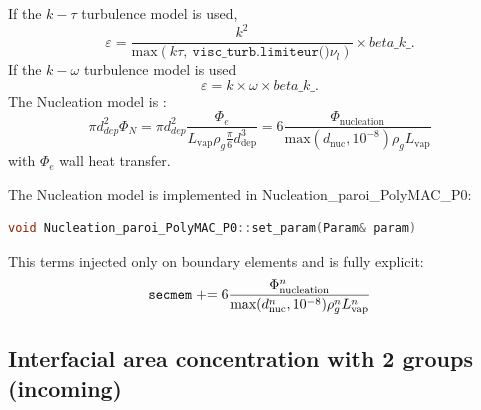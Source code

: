 If the $k-\tau$ turbulence model is used,
\begin{equation}
\varepsilon=\frac{k^2}{\text{max}(k\tau,\ \texttt{visc_turb.limiteur()} \nu_l)}\times beta\_ k \_.
\end{equation}
If the $k-\omega$ turbulence model is used
\begin{equation}
\varepsilon=k\times \omega\times beta\_ k \_.
\end{equation}
The {\colorbox{codebackground}{\color{codekeyword3}  Nucleation}} model is :
\begin{equation}
		\pi d_{dep}^2\Phi_N = \pi d_{dep}^2\frac{\Phi_{e}}{L_{\text{vap}} \rho_g \frac{\pi}{6}d_\text{dep}^3}=6\frac{\Phi_{\text{nucleation}}}{\text{max}(d_{\text{nuc}},10^{-8})\rho_g L_{\text{vap}}}
\end{equation}
with $\Phi_{e}$ wall heat transfer.

The {\colorbox{codebackground}{\color{codekeyword3}  Nucleation}} model is implemented in Nucleation_paroi_PolyMAC_P0:
\begin{lstlisting}[language=c++]
void Nucleation_paroi_PolyMAC_P0::set_param(Param& param)
\end{lstlisting}
This terms injected only on boundary elements and is fully explicit:
\begin{equation}
    \texttt{secmem} \mathrel{+}= 6\frac{\Phi_{\text{nucleation}}^n}{\text{max}(d_{\text{nuc}}^n,10^{-8})\rho_g^n L_{\text{vap}}^n}
\end{equation}

\subsection{Interfacial area concentration with 2 groups (incoming)}

%
